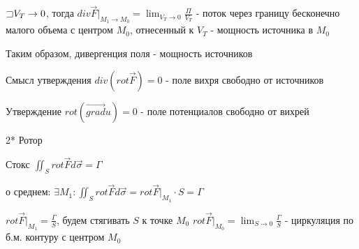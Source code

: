 \documentclass[12pt]{article}
\begin{document}
    $\mathord{\sqsupset} V_T \to 0$, тогда $div \overrightarrow{F} \Big|_{M_1 \to M_0} = \lim_{V_T \to 0} \frac{\Pi}{V_T}$ - поток через границу бесконечно малого объема с центром $M_0$, отнесенный к $V_T$ - мощность источника в $M_0$

    Таким образом, дивергенция поля - мощность источников

    \Nota Смысл утверждения $div (rot \overrightarrow F) = 0$ - поле вихря свободно от источников

    \Nota Утверждение $rot (\overrightarrow{grad} u) = 0$ - поле потенциалов свободно от вихрей

    \mediumvspace

    \hypertarget{rotormechanicalmeaning}{}

    2* Ротор

    Стокс $\iint_S rot \overrightarrow{F} d\overrightarrow{\sigma} = \Gamma$

    \Ths о среднем: $\exists M_1 : \iint_S rot \overrightarrow{F} d\overrightarrow{\sigma} = rot \overrightarrow{F} \Big|_{M_1} \cdot S = \Gamma$

    $rot \overrightarrow{F} \Big|_{M_1} = \frac{\Gamma}{S}$, будем стягивать $S$ к точке $M_0$ \Longrightarrow $rot \overrightarrow{F} \Big|_{M_0} = \lim_{S \to 0} \frac{\Gamma}{S}$ - циркуляция по б.м. контуру с центром $M_0$
\end{document}
